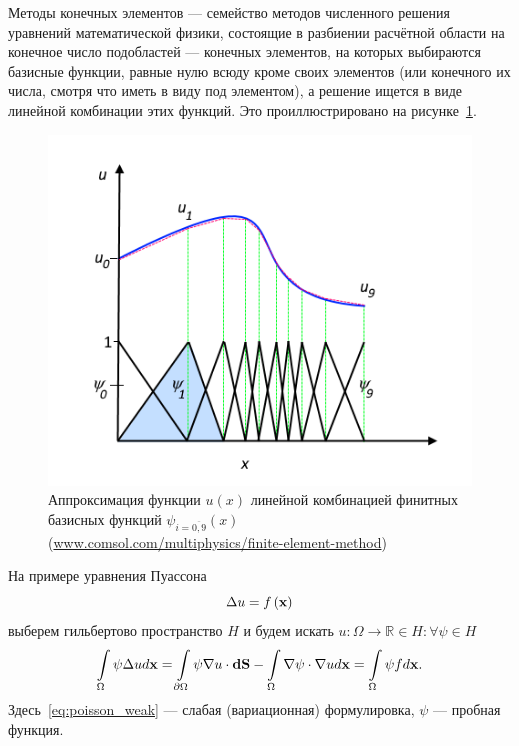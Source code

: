 \documentclass[oneside,final,12pt]{extreport}
\begin{document}
Методы конечных элементов --- семейство методов численного решения
уравнений математической физики, состоящие в разбиении расчётной области
на конечное число подобластей --- конечных элементов,
на которых выбираются базисные функции,
равные нулю всюду кроме своих элементов
(или конечного их числа, смотря что иметь в виду под элементом),
а решение ищется в виде линейной комбинации этих функций.
Это проиллюстрировано на рисунке~\ref{fig:basis_functions_FEM_illustration1d}.

\begin{figure}
  \centering
  \includegraphics[width=.5\textwidth]{pic/basis_functions_FEM_illustration1d}
  \caption{\label{fig:basis_functions_FEM_illustration1d}%
    Аппроксимация функции $u\left(x\right)$ линейной комбинацией
    финитных базисных функций $\psi_{i=\overline{0,9}}\left(x\right)$
    (\href{https://cdn.comsol.com/cyclopedia/finite-element-method/plot-using-discretization.png}
          {www.comsol.com/multiphysics/finite-element-method})
  }

\end{figure}

На примере уравнения Пуассона
\begin{equation} \Delta u = f\left(\vb x\right) \label{eq:poisson_strong}\end{equation}
выберем гильбертово пространство $H$ и будем искать
$u: \Omega \rightarrow \mathbb{R} \in H: \forall \psi \in H$
\begin{equation}
  \int\limits_\Omega \psi \Delta u d\vb x =
  \int\limits_{\partial\Omega} \psi \nabla u \cdot \vb{dS} -
    \int\limits_\Omega \nabla\psi \cdot \nabla u d\vb x =
  \int\limits_\Omega \psi f d\vb x.
\label{eq:poisson_weak}
\end{equation}
Здесь~\eqref{eq:poisson_weak} --- слабая (вариационная) формулировка,
$\psi$ --- пробная функция.
\end{document}
